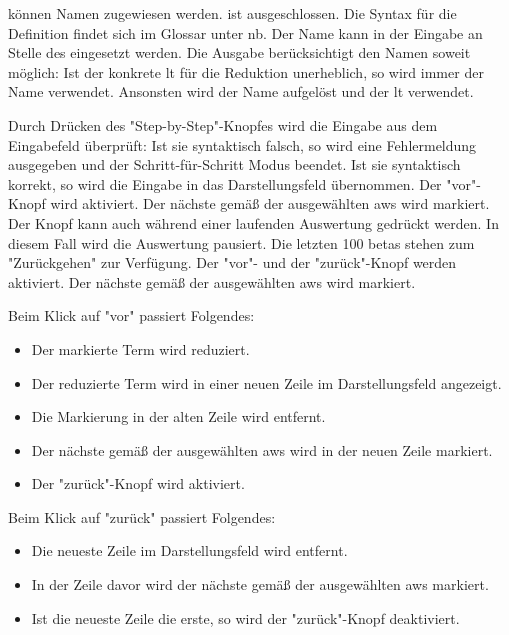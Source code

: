\documentclass[parskip=full,11pt,twoside]{scrartcl}
\begin{document}
 können Namen zugewiesen werden.
 ist ausgeschlossen.
Die Syntax für die Definition findet sich im Glossar unter \gls{nb}.
Der Name kann in der Eingabe an Stelle des  eingesetzt werden.
Die Ausgabe berücksichtigt den Namen soweit möglich:
Ist der konkrete \gls{lt} für die Reduktion unerheblich, so wird immer der Name verwendet.
Ansonsten wird der Name aufgelöst und der \gls{lt} verwendet.

Durch Drücken des "Step-by-Step"-Knopfes wird die Eingabe aus dem Eingabefeld überprüft:
Ist sie syntaktisch falsch, so wird eine Fehlermeldung ausgegeben und der Schritt-für-Schritt Modus beendet.
Ist sie syntaktisch korrekt, so wird die Eingabe in das Darstellungsfeld übernommen. 
Der "vor"-Knopf wird aktiviert.
Der nächste  gemäß der ausgewählten \gls{aws} wird markiert.
\\
Der Knopf kann auch während einer laufenden Auswertung gedrückt werden.
In diesem Fall wird die Auswertung pausiert.
Die letzten 100 \glspl{beta} stehen zum "Zurückgehen" zur Verfügung.
Der "vor"- und der "zurück"-Knopf werden aktiviert.
Der nächste  gemäß der ausgewählten \gls{aws} wird markiert.

Beim Klick auf "vor" passiert Folgendes:
\begin{itemize}
\item Der markierte Term wird reduziert.
\item Der reduzierte Term wird in einer neuen Zeile im Darstellungsfeld angezeigt.
\item Die Markierung in der alten Zeile wird entfernt.
\item Der nächste  gemäß der ausgewählten \gls{aws} wird in der neuen Zeile markiert.
\item Der "zurück"-Knopf wird aktiviert.
\end{itemize}

Beim Klick auf "zurück" passiert Folgendes:
\begin{itemize}
\item Die neueste Zeile im Darstellungsfeld wird entfernt.
\item In der Zeile davor wird der nächste  gemäß der ausgewählten \gls{aws} markiert.
\item Ist die neueste Zeile die erste, so wird der "zurück"-Knopf deaktiviert.
\end{itemize}
\end{document}
